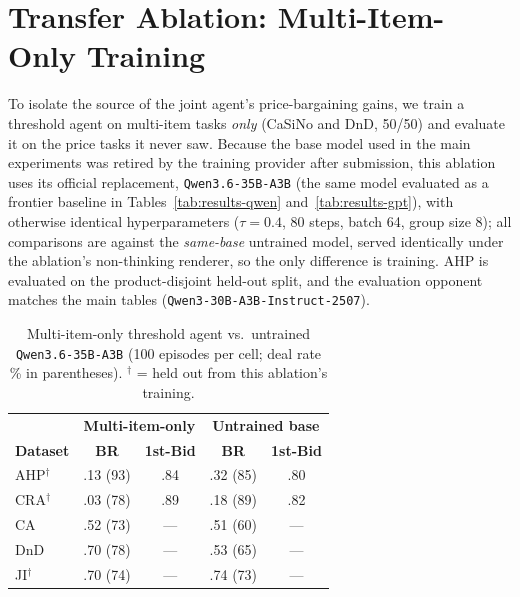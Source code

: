 \documentclass[11pt]{article}
\newcommand{\model}[1]{\texttt{#1}}
\newcommand{\lightrule}{\arrayrulecolor{black!20}\midrule\arrayrulecolor{black}}
\begin{document}
\section{Transfer Ablation: Multi-Item-Only Training}
\label{app:transfer}

To isolate the source of the joint agent's price-bargaining gains, we train a threshold agent on multi-item tasks \emph{only} (CaSiNo and DnD, 50/50) and evaluate it on the price tasks it never saw. Because the base model used in the main experiments was retired by the training provider after submission, this ablation uses its official replacement, \model{Qwen3.6-35B-A3B} (the same model evaluated as a frontier baseline in Tables~\ref{tab:results-qwen} and~\ref{tab:results-gpt}), with otherwise identical hyperparameters ($\tau{=}0.4$, 80 steps, batch 64, group size 8); all comparisons are against the \emph{same-base} untrained model, served identically under the ablation's non-thinking renderer, so the only difference is training. AHP is evaluated on the product-disjoint held-out split, and the evaluation opponent matches the main tables (\model{Qwen3-30B-A3B-Instruct-2507}).

\begin{table}[ht]
\centering
\scriptsize
\setlength{\tabcolsep}{4pt}
\renewcommand{\arraystretch}{1.15}
\begin{tabular}{l cc cc}
\toprule
\rowcolor{tableheader}
& \multicolumn{2}{c}{\textbf{Multi-item-only}} & \multicolumn{2}{c}{\textbf{Untrained base}} \\
\rowcolor{tableheader}
\textbf{Dataset} & \textbf{BR} & \textbf{1st-Bid} & \textbf{BR} & \textbf{1st-Bid} \\
\midrule
\rowcolor{tablerow}
AHP$^\dagger$  & .13 (93) & .84 & .32 (85) & .80 \\
CRA$^\dagger$  & .03 (78) & .89 & .18 (89) & .82 \\
\lightrule
\rowcolor{tablerow}
CA   & .52 (73) & --- & .51 (60) & --- \\
DnD  & .70 (78) & --- & .53 (65) & --- \\
\rowcolor{tablerow}
JI$^\dagger$   & .70 (74) & --- & .74 (73) & --- \\
\bottomrule
\end{tabular}
\caption{Multi-item-only threshold agent vs.\ untrained \model{Qwen3.6-35B-A3B} (100 episodes per cell; deal rate \% in parentheses). $^\dagger$ = held out from this ablation's training.}
\label{tab:transfer}
\end{table}
\end{document}

